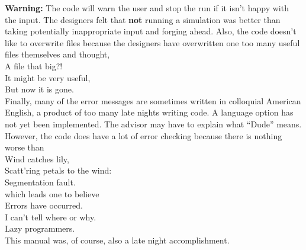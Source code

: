 \documentclass[12pt,titlepage]{article}
\begin{document}
{\bf Warning:} The code will warn the user and stop the run if it isn't happy
with the input. The designers felt that {\bf not} running a
simulation was better than taking potentially inappropriate input 
and forging ahead. 
Also, the code doesn't like to overwrite files because the designers
have overwritten one too many useful files themselves and thought,  \\
\hspace*{1.25in}  A file that big?! \\
\hspace*{1.25in}  It might be very useful,\\
\hspace*{1.25in}  But now it is gone.\\
Finally, many of the error messages are sometimes written in colloquial American English, 
a product of too many late nights writing code. A language option has
not yet been implemented. The advisor may have to explain what
``Dude'' means.  However, the code does have a lot of error
checking because there is nothing worse than \\
\hspace*{1.25in}    Wind catches lily, \\
\hspace*{1.25in}    Scatt'ring petals to the wind:\\
\hspace*{1.25in}    Segmentation fault.\\
which leads one to believe \\
\hspace*{1.25in}  Errors have occurred. \\
\hspace*{1.25in}  I can't tell where or why.\\
\hspace*{1.25in}  Lazy programmers.\\
This manual was, of course, also a late night accomplishment.

\newpage
\hrulefill


\newpage
\hrulefill



\newpage
\hrulefill
\end{document}
